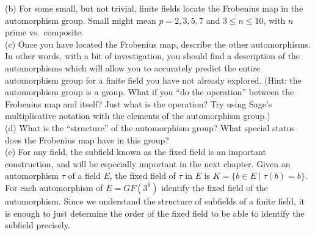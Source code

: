 %
(b)  For some small, but not trivial, finite fields locate the Frobenius map in the automorphism group.  Small might mean $p=2,3,5,7$ and $3\leq n\leq 10$, with $n$ prime vs.\ composite.\\
%
(c)  Once you have located the Frobenius map, describe the other automorphisms.  In other words, with a bit of investigation, you should find a description of the automorphisms which will allow you to accurately predict the entire automorphism group for a finite field you have not already explored.  (Hint: the automorphism group is a group.  What if you ``do the operation'' between the Frobenius map and itself?  Just what is the operation?  Try using Sage's multiplicative notation with the elements of the automorphism group.)\\
%
(d)  What is the ``structure'' of the automorphism group?  What special status does the Frobenius map have in this group?\\
%
(e)  For any field, the subfield known as the fixed field is an important construction, and will be especially important in the next chapter.  Given an automorphism $\tau$ of a field $E$, the fixed field of $\tau$ in $E$ is $K=\{b\in E\mid\tau(b)=b\}$.  For each automorphism of $E=GF(3^6)$ identify the fixed field of the automorphism.  Since we understand the structure of subfields of a finite field, it is enough to just determine the order of the fixed field to be able to identify the subfield precisely.
%
\begin{sageverbatim}
\end{sageverbatim}


